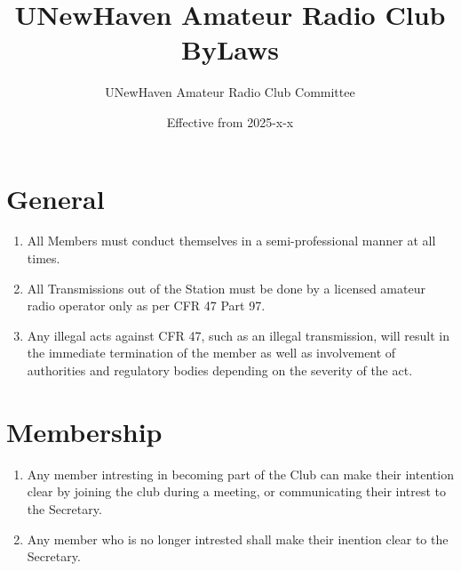 \documentclass[a4paper,12pt]{article}
\title{UNewHaven Amateur Radio Club ByLaws}
\author{UNewHaven Amateur Radio Club Committee}
\date{Effective from 2025-x-x}
\begin{document}
\maketitle

\section{General}
\begin{enumerate}[label=\thesection.\arabic*.]
  \item All Members must conduct themselves in a semi-professional manner at all times.
  \item All Transmissions out of the Station must be done by a licensed amateur radio operator only as per CFR 47 Part 97.
  \item Any illegal acts against CFR 47, such as an illegal transmission, will result in the immediate termination of the member as well as involvement of authorities and regulatory bodies depending on the severity of the act.
\end{enumerate}

\section{Membership}
\begin{enumerate}[label=\thesection.\arabic*.]
  \item Any member intresting in becoming part of the Club can make their intention clear by joining the club during a meeting, or communicating their intrest to the Secretary.
  \item Any member who is no longer intrested shall make their inention clear to the Secretary.
\end{enumerate}
\end{document}
